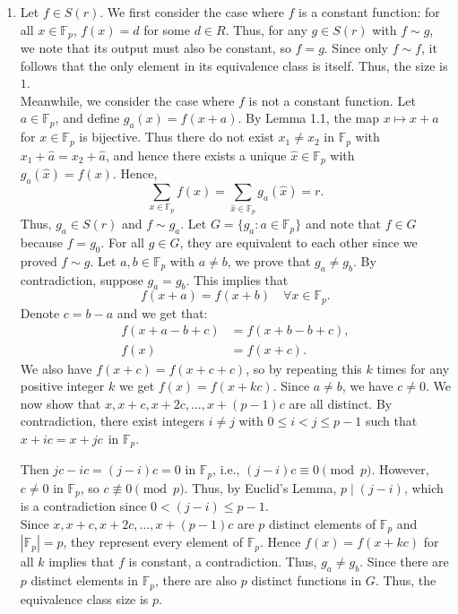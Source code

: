 \documentclass{article}
\begin{document}
\begin{enumerate}
\begin{enumerate}
    \item 
    Let $f \in S(r)$. We first consider the case where $f$ is a constant function: for all $x \in \mathbb{F}_p$, $f(x) = d$ for some $d \in R$. Thus, for any $g \in S(r)$ with $f \sim g$, we note that its output must also be constant, so $f = g$. Since only $f \sim f$, it follows that the only element in its equivalence class is itself. Thus, the size is $1$. \\
    
    Meanwhile, we consider the case where $f$ is not a constant function. Let $a \in \mathbb{F}_p$, and define $g_a(x) = f(x+a)$. By Lemma 1.1, the map $x \mapsto x + a$ for $x \in \mathbb{F}_p$ is bijective. Thus there do not exist $x_1 \neq x_2$ in $\mathbb{F}_p$ with $x_1 + \hat{a} = x_2 + \hat{a}$, and hence there exists a unique $\hat{x} \in \mathbb{F}_p$ with $g_a(\hat{x}) = f(x)$. Hence, 
    \[
    \sum_{x \in \mathbb{F}_p} f(x) = \sum_{\hat{x} \in \mathbb{F}_p} g_a(\hat{x}) = r.
    \]
    Thus, $g_a \in S(r)$ and $f \sim g_a$. Let $G=\{g_a : a \in \mathbb{F}_p\}$ and note that $f \in G$ because $f = g_0$. For all $g \in G$, they are equivalent to each other since we proved $f \sim g$. Let $a,b \in \mathbb{F}_p$ with $a \neq b$, we prove that $g_a \neq g_b$. By contradiction, suppose $g_a = g_b$. This implies that
    \[
    f(x + a) = f(x + b)\quad \forall x \in \mathbb{F}_p.
    \]
    Denote $c = b - a$ and we get that: 
    \begin{align*}
    f(x + a - b + c) &= f(x + b - b + c),\\
    f(x) &= f(x + c).
    \end{align*}
    We also have $f(x + c) = f(x + c + c)$, so by repeating this $k$ times for any positive integer $k$ we get $f(x) = f(x + kc)$. Since $a \neq b$, we have $c \neq 0$. We now show that $x, x + c, x + 2c, \dots, x + (p-1)c$ are all distinct. By contradiction, there exist integers $i \neq j$ with $0 \le i < j \le p - 1$ such that $x + ic = x + jc \ \ \text{in } \mathbb{F}_p$.

    Then $jc - ic = (j - i)c = 0$ in $\mathbb{F}_p$, i.e., $(j-i)c \equiv 0 \pmod{p}$. However, $c \neq 0$ in $\mathbb{F}_p$, so $c \not\equiv 0 \pmod{p}$. Thus, by Euclid's Lemma, $p \mid (j - i)$, which is a contradiction since $0 < (j - i) \le p - 1$. \\
    
    Since $x, x + c, x + 2c, \dots, x + (p-1)c$ are $p$ distinct elements of $\mathbb{F}_p$ and $|\mathbb{F}_p| = p$, they represent every element of $\mathbb{F}_p$. Hence $f(x) = f(x + kc)$ for all $k$ implies that $f$ is constant, a contradiction. Thus, $g_a \neq g_b$. Since there are $p$ distinct elements in $\mathbb{F}_p$, there are also $p$ distinct functions in $G$. Thus, the equivalence class size is $p$.


\end{enumerate}
\end{enumerate}
\end{document}
